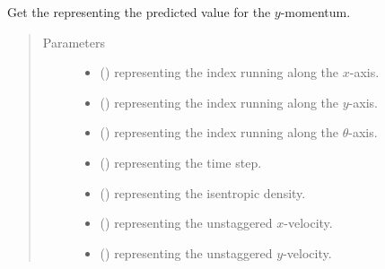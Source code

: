 \documentclass[letterpaper,10pt,english]{sphinxmanual}
\begin{document}
\begin{fulllineitems}

\begin{fulllineitems}
\label{\detokenize{api:dycore.flux_isentropic.FluxIsentropicMacCormack._get_maccormack_predicted_value_momentum_y}}
Get the  representing the predicted value for the \(y\)-momentum.
\begin{quote}\begin{description}
\item[{Parameters}] \leavevmode\begin{itemize}
\item {} 
 () \textendash{}  representing the index running along the \(x\)-axis.

\item {} 
 () \textendash{}  representing the index running along the \(y\)-axis.

\item {} 
 () \textendash{}  representing the index running along the \(\theta\)-axis.

\item {} 
 () \textendash{}  representing the time step.

\item {} 
 () \textendash{}  representing the isentropic density.

\item {} 
 () \textendash{}  representing the unstaggered \(x\)-velocity.

\item {} 
 () \textendash{}  representing the unstaggered \(y\)-velocity.


\end{itemize}
\end{description}
\end{quote}
\end{fulllineitems}
\end{fulllineitems}
\end{document}
